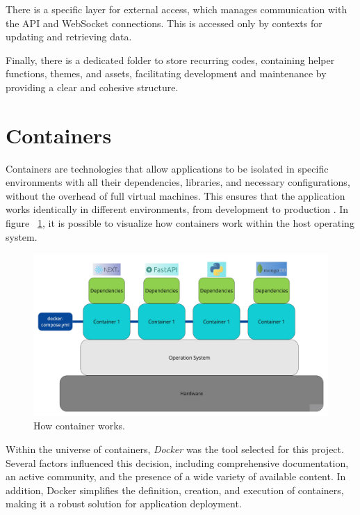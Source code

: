 There is a specific layer for external access, which manages communication with the \gls{API} and WebSocket connections. This is accessed only by contexts for updating and retrieving data.

Finally, there is a dedicated folder to store recurring codes, containing helper functions, themes, and assets, facilitating development and maintenance by providing a clear and cohesive structure.


\section{Containers}
Containers are technologies that allow applications to be isolated in specific environments with all their dependencies, libraries, and necessary configurations, without the overhead of full virtual machines. This ensures that the application works identically in different environments, from development to production \cite{paraiso2016model}. In figure ~\ref{fig:container}, it is possible to visualize how containers work within the host operating system.

\begin{figure}[htbp]
	\centering
	\includegraphics[scale=0.12]{images/container.jpg}
	\caption{How container works.}
	\label{fig:container}
\end{figure}

Within the universe of containers, \textit{Docker} \cite{dockerDocs} was the tool selected for this project. Several factors influenced this decision, including comprehensive documentation, an active community, and the presence of a wide variety of available content. In addition, Docker simplifies the definition, creation, and execution of containers, making it a robust solution for application deployment.

